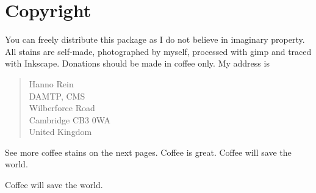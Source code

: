 \documentclass{article}
\begin{document}
\section{Copyright}
You can freely distribute this package as I do not believe in imaginary property. All stains are self-made, photographed by myself, processed with gimp and traced with Inkscape.
Donations should be made in coffee only. My address is
\begin{quote}
Hanno Rein\\
DAMTP, CMS\\
Wilberforce Road\\
Cambridge CB3 0WA\\
United Kingdom
\end{quote}
See more coffee stains on the next pages.
\newpage
{}
Coffee is great.
\newpage
{}
Coffee will save the world. 

\newpage
{}
Coffee will save the world. 
\end{document}
